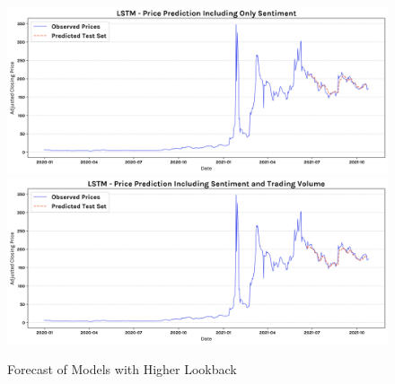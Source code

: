 \documentclass[11pt, a4paper]{article}
\begin{document}
\begin{figure}[!htb]
    \centering
    \includegraphics[width=\textwidth]{only_sentiment_pred.png}
    \includegraphics[width=\textwidth]{all_features_pred.png}
    \caption{Forecast of Models with Higher Lookback}
    \label{fig:high_lookback}
\end{figure}
\end{document}
